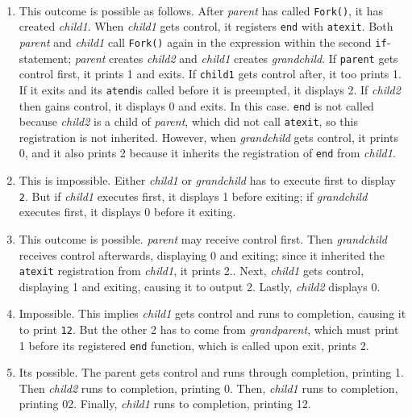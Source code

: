 \documentclass[12pt]{article}
\newenvironment{sol}[1][Solution]{\begin{trivlist}
		\item[\hskip \labelsep {\bfseries #1:}]}{\end{trivlist}}
\begin{document}
\begin{sol}
	\
	\begin{enumerate}[label=(\alph*)]
		\item This outcome is possible as follows. After \emph{parent} has called \texttt{Fork()},
		it has created \emph{child1}. When \emph{child1} gets control, it registers \texttt{end}
		with \texttt{atexit}. Both \emph{parent} and \emph{child1} call \texttt{Fork()} again in
		the expression within the second \texttt{if}-statement; \emph{parent} creates \emph{child2} and
		\emph{child1} creates \emph{grandchild}. If \texttt{parent} gets control first, it prints 1 and exits.
		If \texttt{child1} gets control after, it too prints 1. If it exits and its \texttt{atend}is called
		before it is preempted, it displays 2. If \emph{child2} then gains control, it displays 0
		and exits. In this case. \texttt{end} is not called because \emph{child2} is a child of
		\emph{parent}, which did not call \texttt{atexit}, so this registration is not inherited.
		However, when \emph{grandchild} gets control, it prints 0, and it also prints 2 because it
		inherits the registration of \texttt{end} from \emph{child1}.
		
		\item This is impossible. Either \emph{child1} or \emph{grandchild} has to execute first
		to display \texttt{2}. But if \emph{child1} executes first, it displays 1 before
		exiting; if \emph{grandchild} executes first, it displays 0 before it exiting.
		
		\item This outcome is possible. \emph{parent} may receive control first. Then \emph{grandchild}
		receives control afterwards, displaying 0 and exiting; since it inherited the \texttt{atexit}
		registration from \emph{child1}, it prints 2.. Next, \emph{child1} gets control, displaying 1 and
		exiting, causing it to output 2. Lastly, \emph{child2} displays 0.
		
		\item Impossible. This implies \emph{child1} gets control and runs to completion, causing it
		to print \texttt{12}. But the other 2 has to come from \emph{grandparent}, which must print 1
		before its registered \texttt{end} function, which is called upon exit, prints 2.
	
		\item Its possible. The parent gets control and runs through completion, printing 1. Then
		\emph{child2} runs to completion, printing 0. Then, \emph{child1} runs to completion,
		printing 02. Finally, \emph{child1} runs to completion, printing 12.
	\end{enumerate}
\end{sol}
\end{document}
